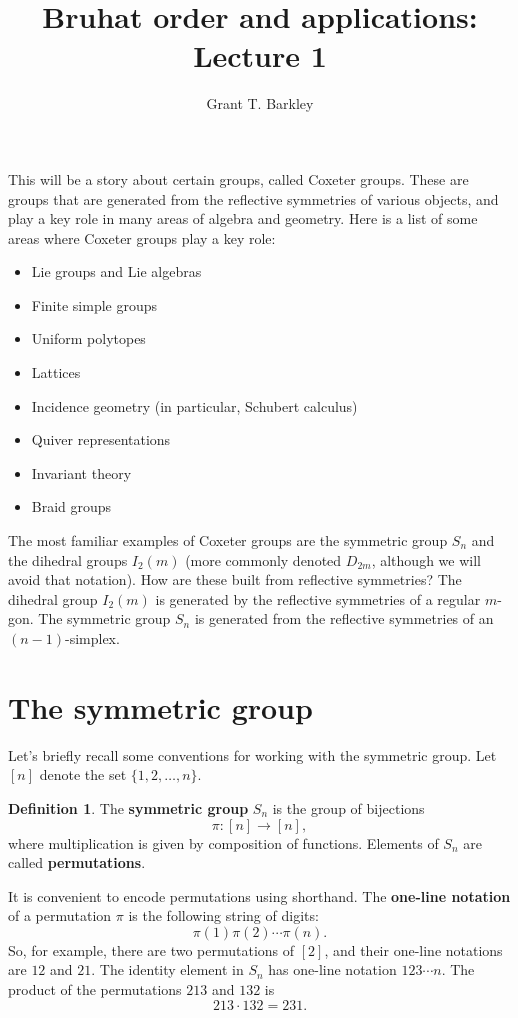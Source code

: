 \documentclass{article}
\title{Bruhat order and applications: Lecture 1}
\author{Grant T. Barkley}
\date{}
\numberwithin{equation}{section}
\newcommand{\newword}[1]{\textbf{#1}}
\theoremstyle{remark}
\theoremstyle{definition}
\newtheorem{definition}[theorem]{Definition}
\begin{document}
	\maketitle
	
	This will be a story about certain groups, called Coxeter groups. These are groups that are generated from the reflective symmetries of various objects, and play a key role in many areas of algebra and geometry. Here is a list of some areas where Coxeter groups play a key role:
	\begin{itemize}
		\item Lie groups and Lie algebras
		\item Finite simple groups
		\item Uniform polytopes
		\item Lattices
		\item Incidence geometry (in particular, Schubert calculus)
		\item Quiver representations
		\item Invariant theory
		\item Braid groups
	\end{itemize} 
	
	The most familiar examples of Coxeter groups are the symmetric group $S_n$ and the dihedral groups $I_2(m)$ (more commonly denoted $D_{2m}$, although we will avoid that notation). How are these built from reflective symmetries? The dihedral group $I_2(m)$ is generated by the reflective symmetries of a regular $m$-gon. The symmetric group $S_n$ is generated from the reflective symmetries of an $(n-1)$-simplex.
	
	
	
	\section{The symmetric group}
	Let's briefly recall some conventions for working with the symmetric group. Let $[n]$ denote the set $\{1,2,\ldots, n\}$.
	\begin{definition}
		The \newword{symmetric group} $S_n$ is the group of bijections
		\[ \pi : [n] \to [n], \]
		where multiplication is given by composition of functions. Elements of $S_n$ are called \newword{permutations}.
	\end{definition}
	It is convenient to encode permutations using shorthand. The \newword{one-line notation} of a permutation $\pi$ is the following string of digits:
	\[ \pi(1)\pi(2)\cdots \pi(n). \]
	So, for example, there are two permutations of $[2]$, and their one-line notations are $12$ and $21$. The identity element in $S_n$ has one-line notation $123\cdots n$. The product of the permutations $213$ and $132$ is
	\[ 213 \cdot 132 = 231. \]
	
\end{document}
